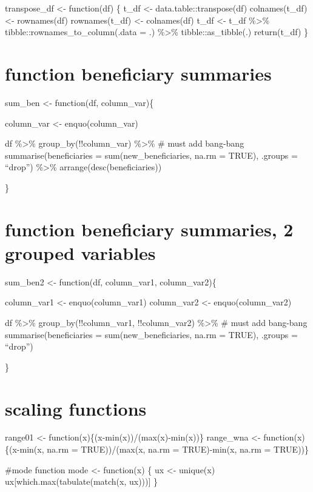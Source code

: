 \documentclass[
]{article}
\begin{document}
transpose\_df \textless- function(df) \{ t\_df \textless-
data.table::transpose(df) colnames(t\_df) \textless- rownames(df)
rownames(t\_df) \textless- colnames(df) t\_df \textless- t\_df
\%\textgreater\% tibble::rownames\_to\_column(.data = .)
\%\textgreater\% tibble::as\_tibble(.) return(t\_df) \}

\hypertarget{function-beneficiary-summaries}{%
\section{function beneficiary
summaries}\label{function-beneficiary-summaries}}

sum\_ben \textless- function(df, column\_var)\{

column\_var \textless- enquo(column\_var)

df \%\textgreater\% group\_by(!!column\_var) \%\textgreater\% \# must
add bang-bang summarise(beneficiaries = sum(new\_beneficiaries, na.rm =
TRUE), .groups = ``drop'') \%\textgreater\% arrange(desc(beneficiaries))

\}

\hypertarget{function-beneficiary-summaries-2-grouped-variables}{%
\section{function beneficiary summaries, 2 grouped
variables}\label{function-beneficiary-summaries-2-grouped-variables}}

sum\_ben2 \textless- function(df, column\_var1, column\_var2)\{

column\_var1 \textless- enquo(column\_var1) column\_var2 \textless-
enquo(column\_var2)

df \%\textgreater\% group\_by(!!column\_var1, !!column\_var2)
\%\textgreater\% \# must add bang-bang summarise(beneficiaries =
sum(new\_beneficiaries, na.rm = TRUE), .groups = ``drop'')

\}

\hypertarget{scaling-functions}{%
\section{scaling functions}\label{scaling-functions}}

range01 \textless- function(x)\{(x-min(x))/(max(x)-min(x))\} range\_wna
\textless- function(x)\{(x-min(x, na.rm = TRUE))/(max(x, na.rm =
TRUE)-min(x, na.rm = TRUE))\}

\#mode function mode \textless- function(x) \{ ux \textless- unique(x)
ux{[}which.max(tabulate(match(x, ux))){]} \}
\end{document}
